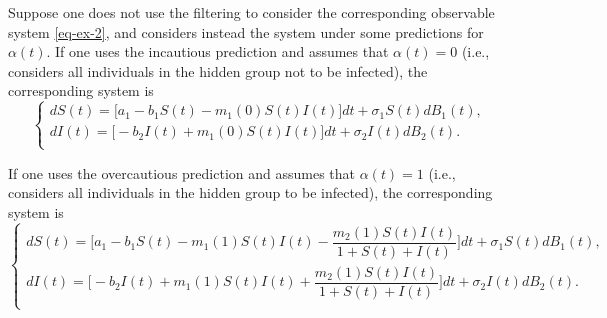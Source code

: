 \documentclass[12pt]{amsart}
\theoremstyle{remark}
\numberwithin{equation}{section}
\numberwithin{equation}{section}
\newcommand{\1}{\boldsymbol{1}}
\def\bar{\overline}
\begin{document}
Suppose one does not use the filtering to consider the corresponding observable system \eqref{eq-ex-2}, and considers instead the system under some
predictions for $\alpha(t)$.
If one uses the incautious prediction and assumes that $\alpha(t)=0$ (i.e., considers all individuals in the hidden group not to be infected), the corresponding system is
\begin{equation}\label{eq-ex-4}
\begin{cases}
dS(t)=\Big[a_1-b_1S(t)-m_1(0)S(t)I(t)\Big]dt + \sigma_1 S(t) dB_1(t),\\[2ex]
dI(t)=\Big[-b_2I(t) + m_1(0)S(t)I(t)\Big]dt + \sigma_2I(t) dB_2(t).\\
\end{cases}
\end{equation}

If one uses the overcautious prediction and assumes that $\alpha(t)=1$ (i.e., considers all individuals in the hidden group to be infected), the corresponding system is
 \begin{equation}\label{eq-ex-5}
 \begin{cases}
 dS(t)=\Big[a_1-b_1S(t)-m_1(1)S(t)I(t)-\dfrac{m_2(1)S(t)I(t)}{1+S(t)+I(t)}\Big]dt + \sigma_1 S(t) dB_1(t),\\[2ex]
 dI(t)=\Big[-b_2I(t) + m_1(1)S(t)I(t)+\dfrac{m_2(1)S(t)I(t)}{1+S(t)+I(t)}\Big]dt + \sigma_2I(t) dB_2(t).\\
 \end{cases}
 \end{equation}
\end{document}
